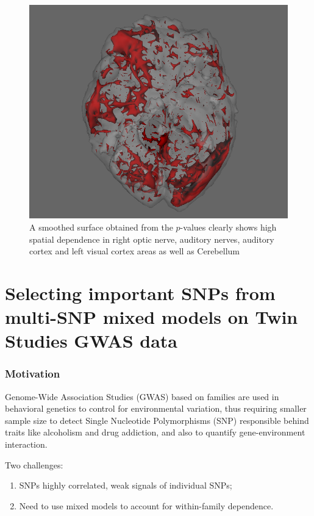 \documentclass[handout,10pt]{beamer}
\begin{document}
\begin{frame}

\begin{figure}
\centering
\captionsetup{font=footnotesize}
\includegraphics[width=.5\textwidth]{screenshot}
\caption*{A smoothed surface obtained from the $p$-values clearly shows high spatial dependence in right optic nerve, auditory nerves, auditory cortex and left visual cortex areas as well as Cerebellum}
\end{figure}
\end{frame}


\section{Selecting important SNPs from multi-SNP mixed models on Twin Studies GWAS data}


\begin{frame}
\frametitle{Motivation}

Genome-Wide Association Studies (GWAS) based on families are used in behavioral genetics to control for environmental variation, thus requiring smaller sample size to detect Single Nucleotide Polymorphisms (SNP) responsible behind traits like alcoholism and drug addiction, and also to quantify gene-environment interaction.

\vspace{1em}
Two challenges:

\begin{enumerate}
\item SNPs highly correlated, weak signals of individual SNPs;

\item Need to use mixed models to account for within-family dependence.
\end{enumerate}

\end{frame}
\end{document}
